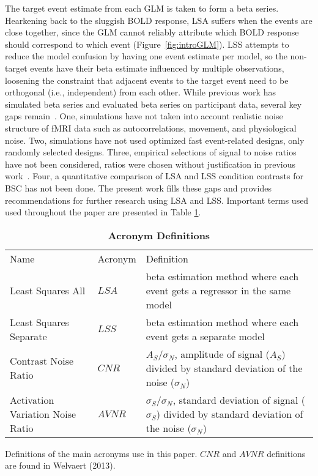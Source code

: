 \documentclass[phd,figures,tables,ackpage,abstractpage,publicabstractpage]{uithesis}
\begin{document}
The target event estimate from each GLM is taken to form a beta series.
Hearkening back to the sluggish BOLD response, LSA suffers when the events are close together,
since the GLM cannot reliably attribute which BOLD response should correspond to which event (Figure~\ref{fig:introGLM}).
LSS attempts to reduce the model confusion by having one event estimate per model,
so the non-target events have their beta estimate influenced by multiple observations, loosening the
constraint that adjacent events to the target event need to be orthogonal (i.e., independent) from each other.
While previous work has simulated beta series and evaluated beta series on participant data,
several key gaps remain~\cite{Mumford2014a,Mumford2012,Turner2012a,Abdulrahman2016,Cisler2012,Arco2018}.
One, simulations have not taken into account realistic noise structure of fMRI data such as autocorrelations, movement, and physiological noise.
Two, simulations have not used optimized fast event-related designs, only randomly selected designs. 
Three, empirical selections of signal to noise ratios have not been considered,
ratios were chosen without justification in previous work~\cite{Abdulrahman2016,Mumford2012}.
Four, a quantitative comparison of LSA and LSS condition contrasts for BSC has not been done.
The present work fills these gaps and provides recommendations for further research
using LSA and LSS.
Important terms used used throughout the paper are presented in Table \ref{table0}.

\begin{table}[H]
  \centering
  \caption{
  {\bf Acronym Definitions}}
  \begin{tabular}{|l|l|p{60mm}|}
  \hline
  Name & Acronym & Definition\\
  Least Squares All & $LSA$ & beta estimation method where each event gets a regressor in the same model\\ \hline
  Least Squares Separate & $LSS$ & beta estimation method where each event gets a separate model\\ \hline
  Contrast Noise Ratio & $CNR$ & $A_S/\sigma_N$, amplitude of signal ($A_S$) divided by standard deviation of the noise ($\sigma_N$)\\ \hline
  Activation Variation Noise Ratio & $AVNR$ & $\sigma_S/\sigma_N$, standard deviation of signal ($\sigma_S$) divided by standard deviation of the noise ($\sigma_N$)\\ \hline
  \end{tabular}

  Definitions of the main acronyms use in this paper.
  $CNR$ and $AVNR$ definitions are found in Welvaert (2013)\cite{Welvaert2013a}.
  \label{table0}
\end{table}
\end{document}
